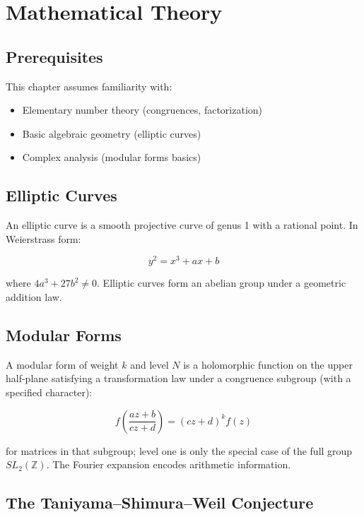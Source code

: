 \section{Mathematical Theory}


\subsection{Prerequisites}
This chapter assumes familiarity with:
\begin{itemize}
\item Elementary number theory (congruences, factorization)
\item Basic algebraic geometry (elliptic curves)
\item Complex analysis (modular forms basics)
\end{itemize}

\subsection{Elliptic Curves}

An elliptic curve is a smooth projective curve of genus 1 with a rational point. In Weierstrass form:

\begin{equation}
y^2 = x^3 + ax + b
\end{equation}

where $4a^3 + 27b^2 \neq 0$. Elliptic curves form an abelian group under a geometric addition law.

\subsection{Modular Forms}

A modular form of weight $k$ and level $N$ is a holomorphic function on the upper half-plane satisfying a transformation law under a congruence subgroup (with a specified character):

\begin{equation}
f\left(\frac{az+b}{cz+d}\right) = (cz+d)^k f(z)
\end{equation}

for matrices in that subgroup; level one is only the special case of the full group $SL_2(\mathbb{Z})$. The Fourier expansion encodes arithmetic information.

\subsection{The Taniyama--Shimura--Weil Conjecture}

